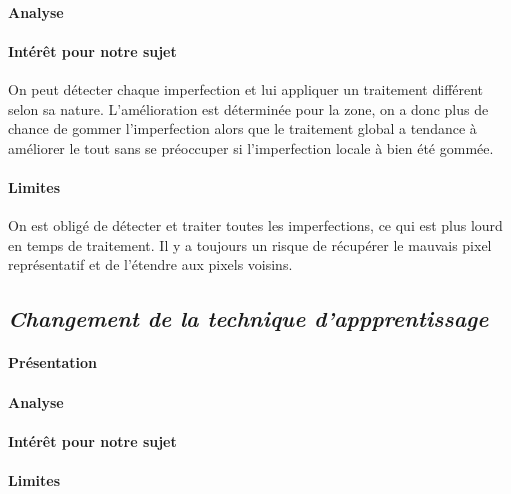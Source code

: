 \documentclass[11pt, french]{report-rd-info}
\begin{document}
\paragraph{Analyse }



\paragraph{Intérêt pour notre sujet }
On peut détecter chaque imperfection et lui appliquer un traitement différent selon sa nature. L’amélioration est déterminée pour la zone, on a donc plus de chance de gommer l’imperfection alors que le traitement global a tendance à améliorer le tout sans se préoccuper si l’imperfection locale à bien été gommée.
\paragraph{Limites }
On est obligé de détecter et traiter toutes les imperfections, ce qui est plus lourd en temps de traitement.
Il y a toujours un risque de récupérer le mauvais pixel représentatif et de l’étendre aux pixels voisins.



\subsection{\emph{Changement de la technique d’appprentissage}}



\paragraph{Présentation }



\paragraph{Analyse }



\paragraph{Intérêt pour notre sujet }



\paragraph{Limites }
\end{document}
